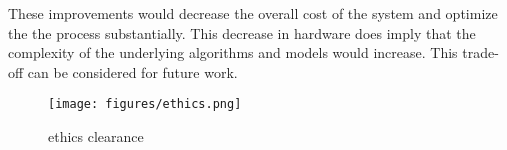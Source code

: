 These improvements would decrease the overall cost of the system and optimize the the process substantially. This decrease in hardware does imply that the complexity of the underlying algorithms and models would increase. This trade-off can be considered for future work.

\newpage
\begin{figure}[!ht] 
\captionsetup{width=1\linewidth, font=small}  
\texttt{[image: figures/ethics.png]}
\caption{ethics clearance}
\label{fig:ethics}
\end{figure}








